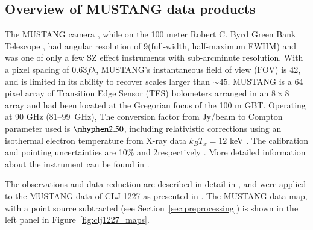 \documentclass[twocolumn,traditabstract]{aa}
\begin{document}
\subsection{Overview of MUSTANG data products}
\label{sec:musobs}
The MUSTANG camera \citep{dicker2008}, while on the 100 meter Robert C. Byrd Green Bank Telescope
\citep[GBT, ][]{jewell2004}, had angular resolution of 9\asec (full-width, half-maximum FWHM) and was one of only
a few SZ effect instruments with sub-arcminute resolution. With a pixel spacing of 0.63$f \lambda$, MUSTANG's
instantaneous field of view (FOV) is 42\asecs, and is limited in its ability to recover scales larger than $\sim45$\asec.
MUSTANG is a 64 pixel array of Transition Edge Sensor (TES) bolometers arranged in an $8 \times 8$ array
and had been located at the Gregorian focus of the 100 m GBT. Operating at 90 GHz (81--99~GHz),
The conversion factor from Jy/beam to Compton parameter used is $\mhyphen 2.50$, including relativistic
corrections using an isothermal electron temperature from X-ray data $k_B T_x = 12$ keV \citep{sayers2013}.
The calibration and pointing uncertainties are 10\% and 2\asec respectively \citep{romero2017}.
More detailed information about the instrument can be found in \citet{dicker2008}. 

The observations and data reduction are described in detail in \citet{romero2015a}, and were applied to the MUSTANG
data of CLJ 1227 as presented in \citet{romero2017}.
The MUSTANG data map, with a point source subtracted (see Section~\ref{sec:preprocessing})
is shown in the left panel in Figure~\ref{fig:clj1227_maps}.
\end{document}
